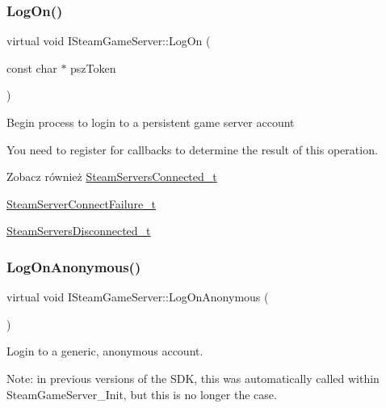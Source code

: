 \subsubsection{\texorpdfstring{Log\+On()}{LogOn()}}
{\footnotesize\ttfamily virtual void I\+Steam\+Game\+Server\+::\+Log\+On (\begin{DoxyParamCaption}\item[{const char $\ast$}]{psz\+Token }\end{DoxyParamCaption})\hspace{0.3cm}{\ttfamily [pure virtual]}}

Begin process to login to a persistent game server account

You need to register for callbacks to determine the result of this operation. \begin{DoxySeeAlso}{Zobacz również}
\hyperlink{struct_steam_servers_connected__t}{Steam\+Servers\+Connected\+\_\+t} 

\hyperlink{struct_steam_server_connect_failure__t}{Steam\+Server\+Connect\+Failure\+\_\+t} 

\hyperlink{struct_steam_servers_disconnected__t}{Steam\+Servers\+Disconnected\+\_\+t} 
\end{DoxySeeAlso}
\mbox{\label{class_i_steam_game_server_ab54477676e6915f33d32b42e71ae63ab}} 
\subsubsection{\texorpdfstring{Log\+On\+Anonymous()}{LogOnAnonymous()}}
{\footnotesize\ttfamily virtual void I\+Steam\+Game\+Server\+::\+Log\+On\+Anonymous (\begin{DoxyParamCaption}{ }\end{DoxyParamCaption})\hspace{0.3cm}{\ttfamily [pure virtual]}}

Login to a generic, anonymous account.

Note\+: in previous versions of the S\+DK, this was automatically called within Steam\+Game\+Server\+\_\+\+Init, but this is no longer the case. \mbox{\label{class_i_steam_game_server_ac49da636dd3719648ddf39e882fa9639}} 

